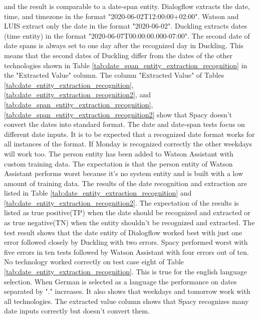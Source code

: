 and the result is comparable to a date-span entity.
Dialogflow extracts the date, time, and timezone in the format "2020-06-02T12:00:00+02:00".
Watson and LUIS extract only the date in the format "2020-06-02".
Duckling extracts dates (time entity) in the format "2020-06-07T00:00:00.000-07:00".
The second date of date spans is always set to one day after the recognized day in Duckling.
This means that the second dates of Duckling differ from the dates of the other technologies
shown in Table \ref{tab:date_span_entity_extraction_recognition} in the "Extracted Value" column.
The column "Extracted Value" of Tables \ref{tab:date_entity_extraction_recognition},
\ref{tab:date_entity_extraction_recognition2},
and \ref{tab:date_span_entity_extraction_recognition},
\ref{tab:date_span_entity_extraction_recognition2} show that Spacy doesn't 
convert the dates into standard format.
The date and date-span tests focus on different date inputs.
It is to be expected that a recognized date format works for 
all instances of the format.
If Monday is recognized correctly the other weekdays will work too. 
The person entity has been added to Watson Assistant with custom training data.
The expectation is that the person entity of Watson Assistant performs worst because 
it's no system entity and is built with a low amount of training data.
The results of the date recognition and extraction are listed in Table \ref{tab:date_entity_extraction_recognition}
and \ref{tab:date_entity_extraction_recognition2}.
The expectation of the results is listed as true positive(TP) when the date should be recognized and extracted or as true negative(TN)
when the entity shouldn't be recognized and extracted.
The test result shows that the date entity of Dialogflow worked best with just one error
followed closely by Duckling with two errors.
Spacy performed worst with five errors in ten tests followed by Watson Assistant with four errors out of ten.
No technology worked correctly on test case eight of Table \ref{tab:date_entity_extraction_recognition}.
This is true for the english language selection.
When German is selected as a language the performance on dates separated by
"." increases.
It also shows that weekdays and tomorrow work with all technologies.
The extracted value column shows that Spacy recognizes many date inputs correctly but doesn't convert them.

